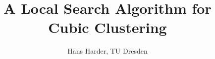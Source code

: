 \documentclass[hidelinks,12pt,a4paper]{article}
\title{A Local Search Algorithm for Cubic Clustering}
\author{Hans Harder, TU Dresden}
\date{}
\numberwithin{equation}{section}
\begin{document}
\maketitle

\tableofcontents
\newpage









{}

\end{document}
